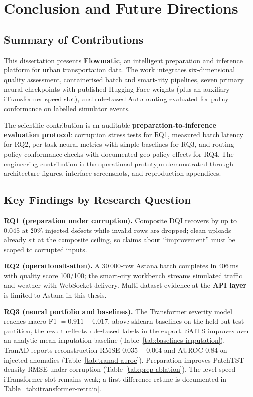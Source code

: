 %
%
\chapter{Conclusion and Future Directions}
\label{chap:conclusion}
\setlength{\parskip}{0.8em}

\section{Summary of Contributions}

This dissertation presents \textbf{Flowmatic}, an intelligent preparation and inference platform for urban transportation data. The work integrates six-dimensional quality assessment, containerised batch and smart-city pipelines, seven primary neural checkpoints with published Hugging Face weights (plus an auxiliary iTransformer speed slot), and rule-based Auto routing evaluated for policy conformance on labelled simulator events.

The scientific contribution is an auditable \textbf{preparation-to-inference evaluation protocol}: corruption stress tests for RQ1, measured batch latency for RQ2, per-task neural metrics with simple baselines for RQ3, and routing policy-conformance checks with documented geo-policy effects for RQ4. The engineering contribution is the operational prototype demonstrated through architecture figures, interface screenshots, and reproduction appendices.

\section{Key Findings by Research Question}

\textbf{RQ1 (preparation under corruption).} Composite DQI recovers by up to 0.045 at 20\% injected defects while invalid rows are dropped; clean uploads already sit at the composite ceiling, so claims about ``improvement'' must be scoped to corrupted inputs.

\textbf{RQ2 (operationalisation).} A 30\,000-row Astana batch completes in 406\,ms with quality score 100/100; the smart-city workbench streams simulated traffic and weather with WebSocket delivery. Multi-dataset evidence at the \textbf{API layer} is limited to Astana in this thesis.

\textbf{RQ3 (neural portfolio and baselines).} The Transformer severity model reaches macro-F1 $= 0.911 \pm 0.017$, above sklearn baselines on the held-out test partition; the result reflects rule-based labels in the export. SAITS improves over an analytic mean-imputation baseline (Table~\ref{tab:baselines-imputation}). TranAD reports reconstruction RMSE $0.035 \pm 0.004$ and AUROC $0.84$ on injected anomalies (Table~\ref{tab:tranad-auroc}). Preparation improves PatchTST density RMSE under corruption (Table~\ref{tab:prep-ablation}). The level-speed iTransformer slot remains weak; a first-difference retune is documented in Table~\ref{tab:itransformer-retrain}.

